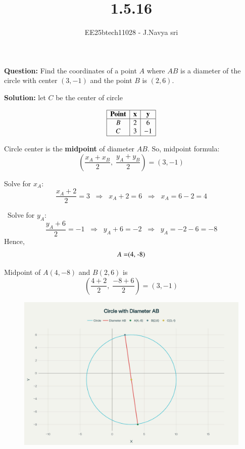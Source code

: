 \documentclass[journal]{IEEEtran}
\begin{document}

\vspace{3cm}

\title{1.5.16}
\author{EE25btech11028 - J.Navya sri}
{\let\newpage\relax\maketitle}

\renewcommand{\thefigure}{\theenumi}
\renewcommand{\thetable}{\theenumi}
\setlength{\intextsep}{10pt} %


\renewcommand{\thetable}{\theenumi}
\textbf{Question:}  
Find the coordinates of a point $A$ where $AB$ is a diameter of the circle with center  
$(3, -1)$ and the point $B$ is $(2, 6)$.

\textbf{Solution:}
let $C$ be the center of circle
\bigskip

 

\[
\begin{array}{|c|c|c|c|}
\hline
\textbf{Point} & \textbf{x} & \textbf{y}\\
\hline
B & 2 & 6 \\
C & 3 & -1 \\
\hline
\end{array}
\]

\begin{enumerate}
 Circle center is the \textbf{midpoint} of diameter $AB$.  
    So, midpoint formula:  
    \[
    \left( \frac{x_A + x_B}{2}, \; \frac{y_A + y_B}{2} \right) = (3, -1)
    \]

 Solve for $x_A$:  
    \[
    \frac{x_A + 2}{2} = 3 \;\;\Rightarrow\;\; x_A + 2 = 6 \;\;\Rightarrow\;\; x_A = 6 - 2 = 4
    \]

    \ Solve for $y_A$:  
    \[
    \frac{y_A + 6}{2} = -1 \;\;\Rightarrow\;\; y_A + 6 = -2 \;\;\Rightarrow\;\; y_A = -2 - 6 = -8
    \]
Hence,  
    \[
    A = $(4, -8)$
    \]
\end{enumerate}

Midpoint of $A(4, -8)$ and $B(2, 6)$ is  
\[
\left( \frac{4+2}{2}, \; \frac{-8+6}{2} \right) = (3, -1)

\]

\begin{figure} [H]
    \centering
    \includegraphics[width=0.8\columnwidth]{figs/fig.png}
    
    \label{fig:placeholder}
\end{figure}
\end{document}
